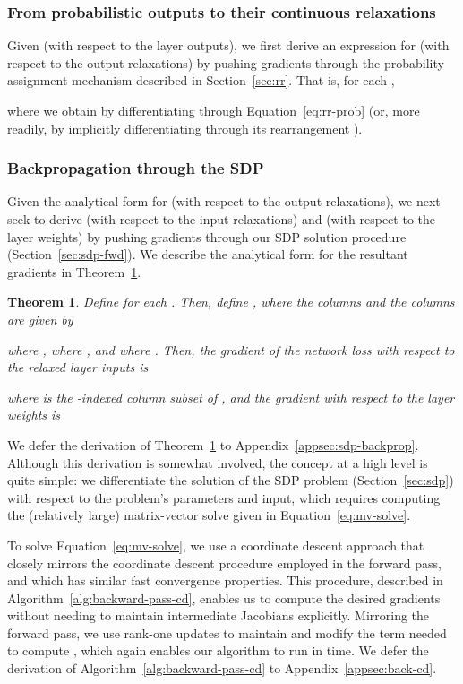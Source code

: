\documentclass{article}
\newtheorem{theorem}{Theorem}
\begin{document}
	\subsubsection{From probabilistic outputs to their continuous relaxations}
	
	Given  (with respect to the layer outputs), we first derive an expression for  (with respect to the output relaxations) by pushing gradients through the probability assignment mechanism described in Section~\ref{sec:rr}.
	That is, for each ,
	
	where we obtain  by differentiating through Equation~\eqref{eq:rr-prob} (or, more readily, by implicitly differentiating through its rearrangement 
	).

	\subsubsection{Backpropagation through the SDP}
	\label{sec:sdp-back}
	
	Given the analytical form for  (with respect to the output relaxations), we next seek to derive  (with respect to the input relaxations) and  (with respect to the layer weights) by pushing gradients through our SDP solution procedure (Section~\ref{sec:sdp-fwd}).
	We describe the analytical form for the resultant gradients in Theorem~\ref{thm:back-grads}.
	
	\begin{theorem}
		Define  for each . Then, define , where the columns  and the columns  are given by
		
	    where , where , and where . 
Then, the gradient of the network loss  with respect to the relaxed layer inputs is
		
	where  is the -indexed column subset of , and the gradient with respect to the layer weights is
		
		\label{thm:back-grads}
	\end{theorem}
	
	We defer the derivation of Theorem~\ref{thm:back-grads} to Appendix~\ref{appsec:sdp-backprop}.
	Although this derivation is somewhat involved, the concept at a high level is quite simple: we differentiate the solution of the SDP problem (Section~\ref{sec:sdp}) with respect to the problem's parameters and input, which requires computing the (relatively large) matrix-vector solve given in Equation~\eqref{eq:mv-solve}. 
	
	To solve Equation~\eqref{eq:mv-solve}, we use a coordinate descent approach that closely mirrors the coordinate descent procedure employed in the forward pass, and which has similar fast convergence properties.
This procedure, described in Algorithm~\ref{alg:backward-pass-cd}, 
enables us to compute the desired gradients without needing to maintain intermediate Jacobians explicitly.
Mirroring the forward pass, we use rank-one updates to maintain and modify the term  needed to compute , which again enables our algorithm to run in  time.
	We defer the derivation of Algorithm~\ref{alg:backward-pass-cd} to Appendix~\ref{appsec:back-cd}.
	
\end{document}
